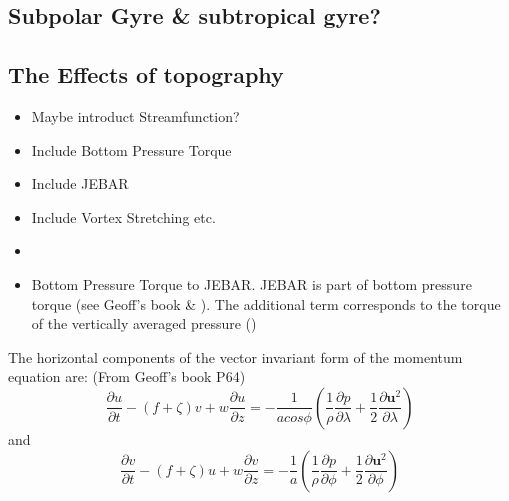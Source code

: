 \documentclass[..\EOYR.tex]{subfiles}
\begin{document}
\subsection{Subpolar Gyre \& subtropical gyre?}

\subsection{The Effects of topography}
\begin{itemize}
    \item Maybe introduct Streamfunction?
    \item Include Bottom Pressure Torque
    \item Include JEBAR
    \item Include Vortex Stretching etc. \citep{Zhang2007}
    \item \citep{Bell1999}
    \item Bottom Pressure Torque to JEBAR. JEBAR is part of bottom pressure torque (see Geoff's book \& \citep{Greatbatch1991}). The additional term corresponds to the torque of the vertically averaged pressure (\citep{Greatbatch1991})
\end{itemize}

The horizontal components of the vector invariant form of the momentum equation are: (From Geoff's book P64)
\begin{equation}\label{VIMomentumU}
    \frac{\partial u}{\partial t} - (f+\zeta)v + w\frac{\partial u}{\partial z} = -\frac{1}{a cos \phi}(\frac{1}{\rho}\frac{\partial p}{\partial \lambda} + \frac{1}{2}\frac{\partial \mathbf{u}^2}{\partial \lambda})
\end{equation}
and
\begin{equation}\label{VIMomentumV}
    \frac{\partial v}{\partial t} - (f+\zeta)u + w\frac{\partial v}{\partial z} = -\frac{1}{a}(\frac{1}{\rho}\frac{\partial p}{\partial \phi} + \frac{1}{2}\frac{\partial \mathbf{u}^2}{\partial \phi})
\end{equation}
\end{document}
